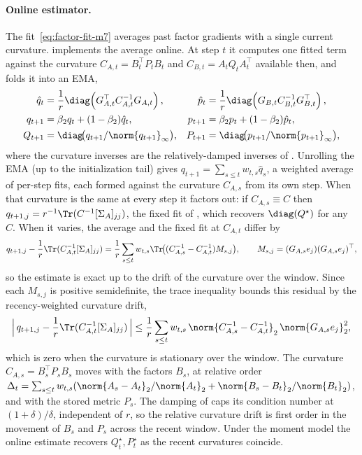 \paragraph{Online estimator.} The fit~\eqref{eq:factor-fit-m7} averages past
factor gradients with a single current curvature. \methodname{} implements
the average online. At step $t$ it computes one fitted term against the
curvature $C_{A,t}=B_t^\top P_tB_t$ and $C_{B,t}=A_tQ_tA_t^\top$ available
then, and folds it into an EMA,
\begin{equation}\label{eq:ours-klcoupling-m7}
\begin{aligned}
  \hat{q}_t &= \frac1r\diag\!\left(G_{A,t}^\top C_{A,t}^{-1}G_{A,t}\right),
  &
  \hat{p}_t &= \frac1r\diag\!\left(G_{B,t} C_{B,t}^{-1}G_{B,t}^\top\right),
  \\
  q_{t+1} &= \beta_2q_t+(1-\beta_2)\hat{q}_t,
  &
  p_{t+1} &= \beta_2p_t+(1-\beta_2)\hat{p}_t,
  \\
  Q_{t+1} &= \diag\!\bigl(q_{t+1}/\norm{q_{t+1}}_\infty\bigr),
  &
  P_{t+1} &= \diag\!\bigl(p_{t+1}/\norm{p_{t+1}}_\infty\bigr),
\end{aligned}
\end{equation}
where the curvature inverses are the relatively-damped inverses of
. Unrolling the EMA (up to the initialization tail) gives
$q_{t+1}=\sum_{s\le t}w_{t,s}\hat q_s$, a weighted average of per-step fits,
each formed against the curvature $C_{A,s}$ from its own step. When that
curvature is the same at every step it factors out: if $C_{A,s}\equiv C$ then
$q_{t+1,j}=r^{-1}\Tr(C^{-1}[\Sigma_A]_{jj})$, the fixed fit of
, which recovers $\diag(Q^\star)$ for any $C$. When it
varies, the average and the fixed fit at $C_{A,t}$ differ by
\[
  q_{t+1,j}-\frac1r\Tr(C_{A,t}^{-1}[\Sigma_A]_{jj})
  =\frac1r\sum_{s\le t}w_{t,s}\Tr\!\big((C_{A,s}^{-1}-C_{A,t}^{-1})M_{s,j}\big),
  \qquad M_{s,j}=(G_{A,s}e_j)(G_{A,s}e_j)^\top,
\]
so the estimate is exact up to the drift of the curvature over the window.
Since each $M_{s,j}$ is positive semidefinite, the trace inequality bounds this
residual by the recency-weighted curvature drift,
\[
  \Big|\,q_{t+1,j}-\frac1r\Tr(C_{A,t}^{-1}[\Sigma_A]_{jj})\,\Big|
  \le
  \frac1r\sum_{s\le t}w_{t,s}\,
  \norm{C_{A,s}^{-1}-C_{A,t}^{-1}}_2\,\norm{G_{A,s}e_j}_2^2 ,
\]
which is zero when the curvature is stationary over the window. The curvature
$C_{A,s}=B_s^\top P_sB_s$ moves with the factors $B_s$, at relative order
$\Delta_t=\sum_{s\le t}w_{t,s}(\norm{A_s-A_t}_2/\norm{A_t}_2+\norm{B_s-B_t}_2/\norm{B_t}_2)$,
and with the stored metric $P_s$. The damping of  caps its
condition number at $(1+\delta)/\delta$, independent of $r$, so the relative
curvature drift is first order in the movement of $B_s$ and $P_s$ across the
recent window. Under the moment model the online estimate recovers $Q^\star_t,P^\star_t$ as the recent
curvatures coincide.

